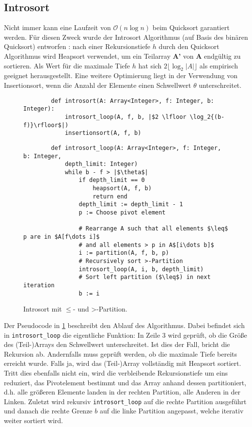 \subsection{Introsort}
\label{section:introsort}

Nicht  immer kann eine Laufzeit von $\mathcal O(n\log{n})$ beim Quicksort garantiert werden.
Für diesen Zweck wurde der Introsort Algorithmus (auf Basis des binären Quicksort) entworfen \cite{Musser97}:
nach einer Rekursionstiefe $h$ durch den Quicksort Algorithmus wird Heapsort verwendet,
um ein Teilarray \textbf{A'} von \textbf{A} endgültig zu sortieren.
Als Wert für die maximale Tiefe $h$ hat sich $2 \lfloor \log_2{|A|}\rfloor$ als empirisch geeignet herausgestellt.
Eine weitere Optimierung liegt in der Verwendung von Insertionsort,
wenn die Anzahl der Elemente einen Schwellwert $\theta$ unterschreitet.

\begin{figure}
	\begin{verbatim}
		def introsort(A: Array<Integer>, f: Integer, b: Integer):
			introsort_loop(A, f, b, |$2 \lfloor \log_2{(b-f)}\rfloor$|)
			insertionsort(A, f, b)
	\end{verbatim}
	
	\begin{verbatim}
		def introsort_loop(A: Array<Integer>, f: Integer, b: Integer, 
			depth_limit: Integer)
			while b - f > |$\theta$|
				if depth_limit == 0
					heapsort(A, f, b)
					return end
				depth_limit := depth_limit - 1
				p := Choose pivot element
				
				# Rearrange A such that all elements $\leq$ p are in $A[f\dots i]$
				# and all elements > p in A$[i\dots b]$
				i := partition(A, f, b, p)
				# Recursively sort >-Partition
				introsort_loop(A, i, b, depth_limit)
				# Sort left partition ($\leq$) in next iteration
				b := i
	\end{verbatim}
	\caption{Introsort mit \glqq $\leq$\grqq- und \glqq >\grqq-Partition.}
	\label{alg:introsort}
\end{figure}

Der Pseudocode in \ref{alg:introsort} beschreibt den Ablauf des Algorithmus.
Dabei befindet sich in \texttt{introsort\_loop} die eigentliche Funktion: In Zeile 3 wird geprüft,
ob die Größe des (Teil-)Arrays den Schwellwert unterschreitet. Ist dies der Fall, bricht die Rekursion ab.
Andernfalls muss geprüft werden, ob die maximale Tiefe bereits erreicht wurde.
Falls ja, wird das (Teil-)Array vollständig mit Heapsort sortiert.
Tritt dies ebenfalls nicht ein, wird die verbleibende Rekursionstiefe um eins reduziert,
das Pivotelement bestimmt und das Array anhand dessen partitioniert,
d.h. alle größeren Elemente landen in der rechten Partition, alle Anderen in der Linken.
Zuletzt wird rekursiv \texttt{introsort\_loop} auf die rechte Partition ausgeführt
und danach die rechte Grenze $b$ auf die linke Partition angepasst, welche iterativ weiter sortiert wird.

